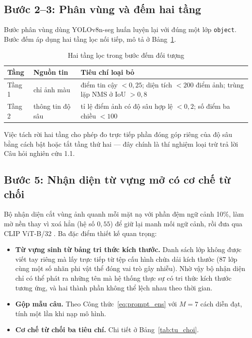 \subsection{Bước 2--3: Phân vùng và đếm hai tầng}

Bước phân vùng dùng YOLOv8n-seg \cite{jocher2023yolov8} huấn luyện lại với đúng một lớp
\texttt{object}. Bước đếm áp dụng hai tầng lọc nối tiếp, mô tả ở Bảng~\ref{tab:hai_tang}.

\begin{table}[H]
\centering
\caption{Hai tầng lọc trong bước đếm đối tượng}
\label{tab:hai_tang}
\small
\begin{tabularx}{\textwidth}{l l X}
\toprule
\textbf{Tầng} & \textbf{Nguồn tin} & \textbf{Tiêu chí loại bỏ} \\
\midrule
Tầng 1 & chỉ ảnh màu
  & điểm tin cậy $< 0{,}25$; diện tích $< 200$ điểm ảnh; trùng lặp NMS ở IoU $> 0{,}8$ \\
\addlinespace
Tầng 2 & thông tin độ sâu
  & tỉ lệ điểm ảnh có độ sâu hợp lệ $< 0{,}2$; số điểm ba chiều $< 100$ \\
\bottomrule
\end{tabularx}
\end{table}

Việc tách rời hai tầng cho phép đo trực tiếp phần đóng góp riêng của độ sâu bằng cách bật hoặc
tắt tầng thứ hai --- đây chính là thí nghiệm loại trừ trả lời Câu hỏi nghiên cứu 1.1.

\subsection{Bước 5: Nhận diện từ vựng mở có cơ chế từ chối}
\label{sec:tuchoi}

Bộ nhận diện cắt vùng ảnh quanh mỗi mặt nạ với phần đệm ngữ cảnh 10\%, làm mờ nền thay vì xoá
hẳn (hệ số $0{,}55$) để giữ lại manh mối ngữ cảnh, rồi đưa qua CLIP ViT-B/32
\cite{radford2021clip,ilharco2021openclip}. Ba đặc điểm thiết kế quan trọng:

\begin{itemize}[leftmargin=1.5cm]
\item \textbf{Từ vựng sinh từ bảng tri thức kích thước.} Danh sách lớp không được viết tay riêng
mà lấy trực tiếp từ tệp cấu hình chứa dải kích thước (87 lớp cùng một số nhãn phi vật thể
đóng vai trò gây nhiễu). Nhờ vậy bộ nhận diện chỉ có thể phát ra những tên mà hệ thống thực sự
có tri thức kích thước tương ứng, và hai thành phần không thể lệch nhau theo thời gian.
\item \textbf{Gộp mẫu câu.} Theo Công thức~\eqref{eq:prompt_ens} với $M = 7$ cách diễn đạt, tính
một lần khi nạp mô hình.
\item \textbf{Cơ chế từ chối ba tiêu chí.} Chi tiết ở Bảng~\ref{tab:tu_choi}.
\end{itemize}

